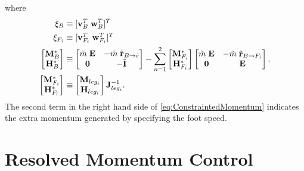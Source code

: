 where
\begin{equation*}
\begin{aligned}
{\bf \xi}_B & \equiv [ {\bf v}^T_{B}\; {\bf w}^T_B]^T\\
{\bf \xi}_{F_i}& \equiv [ {\bf v}^T_{F_i}\; {\bf w}^T_{F_i}]^T\\
\left[
\begin{matrix}
{\bf M}^*_{B}\\
{\bf H}^*_{B}\\
\end{matrix}
\right] &
\equiv
\left[
\begin{matrix}
\tilde{m}\; {\bf E} & -\tilde{m}\; \hat{\bf r}_{B \rightarrow \tilde{c}} \\
{\bf 0}           & - \tilde{\bf I}                                 \\
\end{matrix}
\right]
- \sum^{2}_{n=1}
\left[
\begin{matrix}
{\bf M}^*_{F_i}\\
{\bf H}^*_{F_i}\\
\end{matrix}
\right]
\left[
\begin{matrix}
\tilde{m}\; {\bf E} & -\tilde{m}\; \hat{\bf r}_{B \rightarrow F_i} \\
{\bf 0}           & {\bf E}                                 \\
\end{matrix}
\right], \\
\left[
\begin{matrix}
{\bf M}^*_{F_i}\\
{\bf H}^*_{F_i}\\
\end{matrix}
\right]
& \equiv
\left[
\begin{matrix}
{\bf M}_{leg_i}\\
{\bf H}_{leg_i}\\
\end{matrix}
\right]
{\bf J}^{-1}_{leg_i}.
\end{aligned}\\
\end{equation*}
The second term in the right hand side of \ref{eq:ConstraintedMomentum} indicates
the extra momentum generated by specifying the foot speed.



\section{Resolved Momentum Control}

